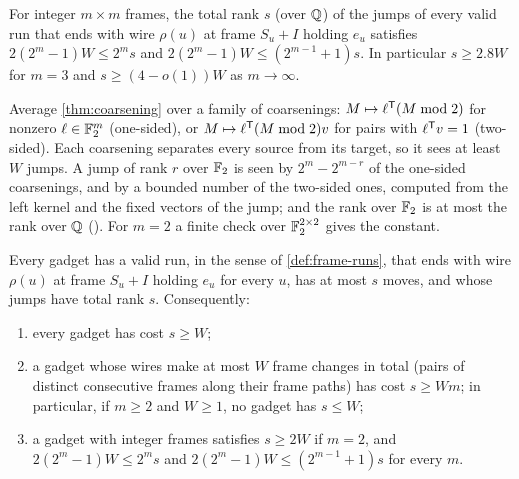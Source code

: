 \begin{theorem}\label{thm:mod2m}
For integer $m\times m$ frames, the total rank $s$ (over $\mathbb{Q}$) of the jumps of every valid run that ends with
wire $\rho(u)$ at frame $S_u+I$ holding $e_u$ satisfies
$2(2^m-1)W\le2^ms$ and $2(2^m-1)W\le(2^{m-1}+1)s$. In particular $s\ge2.8W$ for $m=3$ and
$s\ge(4-o(1))W$ as $m\to\infty$.
\end{theorem}

\begin{outline}
Average \cref{thm:coarsening} over a family of coarsenings: $M\mapsto\ell^{\mathsf{T}}(M\bmod2)$ for nonzero
$\ell\in\mathbb{F}_2^m$ (one-sided), or $M\mapsto\ell^{\mathsf{T}}(M\bmod2)v$ for pairs with $\ell^{\mathsf{T}}v=1$ (two-sided). Each
coarsening separates every source from its target, so it sees at least $W$ jumps. A jump of rank $r$ over
$\mathbb{F}_2$ is seen by $2^m-2^{m-r}$ of the one-sided coarsenings, and by a bounded number of the two-sided ones,
computed from the left kernel and the fixed vectors of the jump; and the rank over $\mathbb{F}_2$ is at most the
rank over $\mathbb{Q}$ (). For $m=2$ a finite check over $\mathbb{F}_2^{2\times2}$ gives the
constant.
\end{outline}


\begin{proposition}\label{prop:gadget-runs}
\notformalized
Every gadget has a valid run, in the sense of \cref{def:frame-runs}, that ends with wire $\rho(u)$ at frame
$S_u+I$ holding $e_u$ for every $u$, has at most $s$ moves, and whose jumps have total rank $s$. Consequently:
\begin{enumerate}[label=(\alph*)]
\item every gadget has cost $s\ge W$;
\item a gadget whose wires make at most $W$ frame changes in total (pairs of distinct consecutive frames along their frame paths) has cost $s\ge Wm$; in particular, if
$m\ge2$ and $W\ge1$, no gadget has $s\le W$;
\item a gadget with integer frames satisfies $s\ge2W$ if $m=2$, and $2(2^m-1)W\le2^ms$ and
$2(2^m-1)W\le(2^{m-1}+1)s$ for every $m$.
\end{enumerate}
\end{proposition}

